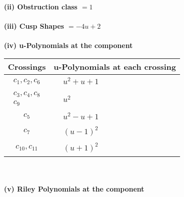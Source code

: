 \documentclass[1p]{elsarticle_modified}
\theoremstyle{definition}
\begin{document}
\flushleft \textbf{(ii) Obstruction class $= 1$}\\~\\
\flushleft \textbf{(iii) Cusp Shapes $= -4 u+2$}\\~\\
\newpage\renewcommand{\arraystretch}{1}
\flushleft \textbf{(iv) u-Polynomials at the component}\newline \\
\begin{tabular}{m{50pt}|m{274pt}}
Crossings & \hspace{64pt}u-Polynomials at each crossing \\
\hline $$\begin{aligned}c_{1},c_{2},c_{6}\end{aligned}$$&$\begin{aligned}
&u^2+u+1
\end{aligned}$\\
\hline $$\begin{aligned}c_{3},c_{4},c_{8}\\c_{9}\end{aligned}$$&$\begin{aligned}
&u^2
\end{aligned}$\\
\hline $$\begin{aligned}c_{5}\end{aligned}$$&$\begin{aligned}
&u^2- u+1
\end{aligned}$\\
\hline $$\begin{aligned}c_{7}\end{aligned}$$&$\begin{aligned}
&(u-1)^2
\end{aligned}$\\
\hline $$\begin{aligned}c_{10},c_{11}\end{aligned}$$&$\begin{aligned}
&(u+1)^2
\end{aligned}$\\
\hline
\end{tabular}\\~\\
\newpage\renewcommand{\arraystretch}{1}
\flushleft \textbf{(v) Riley Polynomials at the component}\newline \\
\end{document}
